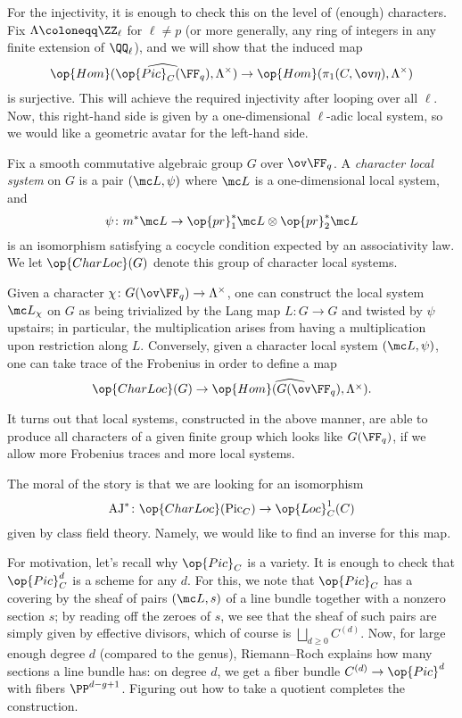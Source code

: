 \documentclass[../notes.tex]{subfiles}
\begin{document}
For the injectivity, it is enough to check this on the level of (enough) characters. Fix $\Lambda\coloneqq\ZZ_\ell$ for $\ell\ne p$ (or more generally, any ring of integers in any finite extension of $\QQ_\ell$), and we will show that the induced map
\[\op{Hom}(\widehat{\op{Pic}_C(\FF_q)},\Lambda^\times)\to\op{Hom}(\pi_1(C,\ov\eta),\Lambda^\times)\]
is surjective. This will achieve the required injectivity after looping over all $\ell$. Now, this right-hand side is given by a one-dimensional $\ell$-adic local system, so we would like a geometric avatar for the left-hand side.
\begin{definition}
	Fix a smooth commutative algebraic group $G$ over $\ov\FF_q$. A \textit{character local system} on $G$ is a pair $(\mc L,\psi)$ where $\mc L$ is a one-dimensional local system, and
	\[\psi\colon m^*\mc L\to\op{pr}_1^*\mc L\otimes\op{pr}_2^*\mc L\]
	is an isomorphism satisfying a cocycle condition expected by an associativity law. We let $\op{CharLoc}(G)$ denote this group of character local systems.
\end{definition}
\begin{example}
	Given a character $\chi\colon G(\ov\FF_q)\to\Lambda^\times$, one can construct the local system $\mc L_\chi$ on $G$ as being trivialized by the Lang map $L\colon G\to G$ and twisted by $\psi$ upstairs; in particular, the multiplication arises from having a multiplication upon restriction along $L$. Conversely, given a character local system $(\mc L,\psi)$, one can take trace of the Frobenius in order to define a map
	\[\op{CharLoc}(G)\to\widehat{\op{Hom}(G(\ov\FF_q),\Lambda^\times)}.\]
\end{example}
\begin{remark}
	It turns out that local systems, constructed in the above manner, are able to produce all characters of a given finite group which looks like $G(\FF_q)$, if we allow more Frobenius traces and more local systems.
\end{remark}
The moral of the story is that we are looking for an isomorphism
\[\mathrm{AJ}^*\colon\op{CharLoc}(\mathrm{Pic}_C)\to\op{Loc}^1_C(C)\]
given by class field theory. Namely, we would like to find an inverse for this map.
\begin{remark}
	For motivation, let's recall why $\op{Pic}_C$ is a variety. It is enough to check that $\op{Pic}_C^d$ is a scheme for any $d$. For this, we note that $\op{Pic}_C$ has a covering by the sheaf of pairs $(\mc L,s)$ of a line bundle together with a nonzero section $s$; by reading off the zeroes of $s$, we see that the sheaf of such pairs are simply given by effective divisors, which of course is $\bigsqcup_{d\ge0}C^{(d)}$. Now, for large enough degree $d$ (compared to the genus), Riemann--Roch explains how many sections a line bundle has: on degree $d$, we get a fiber bundle $C^{(d)}\to\op{Pic}^d$ with fibers $\PP^{d-g+1}$. Figuring out how to take a quotient completes the construction.
\end{remark}
\end{document}
